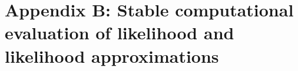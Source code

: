 \chapter{Appendix B: Stable computational evaluation of likelihood and likelihood approximations}
\label{AppendixB}

